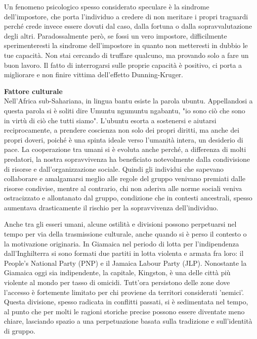 \documentclass[12pt]{book} %
\begin{document}
Un fenomeno psicologico spesso considerato speculare è la sindrome dell'impostore, che porta
l'individuo a credere di non meritare i propri traguardi perché crede invece essere dovuti dal
caso, dalla fortuna o dalla sopravvalutazione degli altri. Paradossalmente però, se fossi un vero impostore, difficilmente sperimenteresti la sindrome dell'impostore in quanto non metteresti in dubbio le tue capacità. Non stai cercando di
truffare qualcuno, ma provando solo a fare un buon lavoro. Il fatto di interrogarsi sulle proprie capacità è positivo,
ci porta a migliorare e non finire vittima dell'effetto Dunning-Kruger.

\noindent \textbf{\large Fattore culturale} \\
Nell'Africa sub-Sahariana, in lingua bantu esiste la parola ubuntu. Appellandosi a questa parola si è soliti dire Umuntu
ngumuntu ngabantu, "io sono ciò che sono in virtù di ciò che tutti siamo". L'ubuntu esorta
a sostenersi e aiutarsi reciprocamente, a prendere coscienza non solo dei propri diritti, ma anche dei propri doveri,
poiché è una spinta ideale verso l'umanità intera, un desiderio di
pace. La cooperazione tra umani si è evoluta anche perché, a differenza di molti predatori, la nostra sopravvivenza ha beneficiato notevolmente dalla condivisione di risorse e dall’organizzazione sociale. 
Quindi gli individui che sapevano collaborare e amalgamarsi meglio alle regole
del gruppo venivano premiati dalle risorse condivise, mentre al contrario, chi non aderiva alle norme sociali veniva
ostracizzato e allontanato dal gruppo, condizione che in contesti ancestrali, spesso aumentava drasticamente il rischio per la sopravvivenza dell'individuo.

Anche tra gli esseri umani, alcune ostilità e divisioni possono perpetuarsi nel tempo per via della trasmissione culturale, anche quando si è perso il contesto o la motivazione originaria. In Giamaica nel periodo di lotta per
l'indipendenza dall'Inghilterra si sono formati due partiti in lotta violenta
e armata fra loro: il People's National Party (PNP) e il Jamaica Labour Party (JLP). Nonostante la Giamaica oggi sia
indipendente, la capitale, Kingston, è una delle città più violente al mondo per tasso di omicidi.
Tutt'ora persistono delle zone dove l'accesso è fortemente limitato per chi proviene da territori considerati 'nemici'. Questa divisione, spesso radicata in conflitti passati, si è sedimentata nel tempo, al punto che per molti le ragioni storiche precise possono essere diventate meno chiare, lasciando spazio a una perpetuazione basata sulla tradizione e sull'identità di gruppo.
\end{document}

